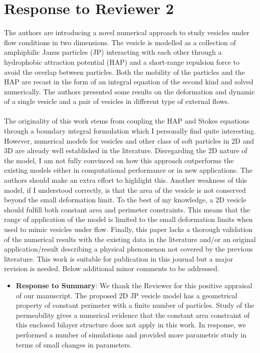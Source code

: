 \documentclass[11pt]{article}
\newcommand{\comment}[1]{{\color{blue} #1}}
\begin{document}
\section*{Response to Reviewer 2}
\comment{
\noindent
The authors are introducing a novel numerical approach to study vesicles
under flow conditions in two dimensions. The vesicle is modelled as a
collection of amphiphilic Janus particles (JP) interacting with each
other through a hydrophobic attraction potential (HAP) and a short-range
repulsion force to avoid the overlap between particles. Both the
mobility of the particles and the HAP are recast in the form of an
integral equation of the second kind and solved numerically. The authors
presented some results on the deformation and dynamic of a single
vesicle and a pair of vesicles in different type of external flows.
\\ \\
\noindent
The originality of this work stems from coupling the HAP and Stokes
equations through a boundary integral formulation which I personally
find quite interesting. However, numerical models for vesicles and other
class of soft particles in 2D and 3D are already well established in the
literature. Disregarding the 2D nature of the model, I am not fully
convinced on how this approach outperforms the existing models either in
computational performance or in new applications. The authors should
make an extra effort to highlight this. Another weakness of this model,
if I understood correctly, is that the area of the vesicle is not
conserved beyond the small deformation limit. To the best of my
knowledge, a 2D vesicle should fulfill both constant area and perimeter
constraints. This means that the range of application of the model is
limited to the small deformation limits when used to mimic vesicles
under flow. Finally, this paper lacks a thorough validation of the
numerical results with the existing data in the literature and/or an
original application/result describing a physical phenomenon not covered
by the previous literature. This work is suitable for publication in
this journal but a major revision is needed. Below additional minor
comments to be addressed.}
\begin{itemize}
  \item {\bf Response to Summary}: We thank the Reviewer for this positive appraisal of 
our manuscript. The proposed 2D JP vesicle model has a geometrical property 
of constant perimeter with a finite number of particles. Study of the permeability gives a numerical evidence that the constant area constraint of this enclosed bilayer structure does not apply in this 
work. In response, we performed a number of simulations and provided more parametric study in 
terms of small changes in parameters. 
\end{itemize}
\end{document}
